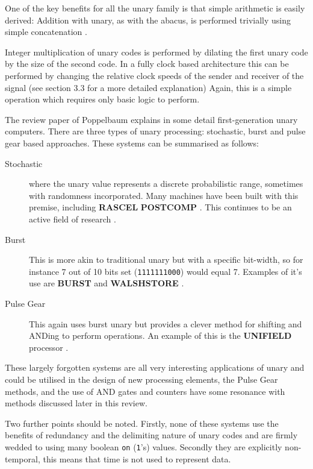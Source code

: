 \documentclass{article}
\begin{document}
One of the key benefits for all the unary family is that simple arithmetic is easily derived: Addition with unary, as with the abacus, is performed trivially using simple concatenation \cite{jonny1}. 

Integer multiplication of unary codes is performed by dilating the first unary code by the size of the second code. In a fully clock based architecture this can be performed by changing the relative clock speeds of the sender and receiver of the signal (see \cite{jonny1} section 3.3 for a more detailed explanation)  Again, this is a simple operation which requires only basic logic to perform. 

The review paper of Poppelbaum \cite{POPPELBAUM198747} explains in some detail first-generation unary computers. There are three types of unary processing: stochastic, burst and pulse gear based approaches. These systems can be summarised as follows:

\begin{description}
  \item[Stochastic] where the unary value represents a discrete probabilistic range, sometimes with randomness incorporated. Many machines have been built with this premise, including \textbf{RASCEL} \cite{esch1969rascel} \textbf{POSTCOMP} \cite{poppelbaum1967stochastic}. This continues to be an active field of research \cite{alaghi2013survey}.
  \item[Burst] This is more akin to traditional unary but with a specific bit-width, so for instance 7 out of 10 bits set (\texttt{1111111000}) would equal 7. Examples of it's use are \textbf{BURST} \cite{POPPELBAUM198747} and \textbf{WALSHSTORE} \cite{bracha1978walshstore}.
  \item[Pulse Gear] This again uses burst unary but provides a clever method for shifting and ANDing to perform operations. An example of this is the \textbf{UNIFIELD} processor \cite{dollas1987architecture}. 
\end{description}

These largely forgotten systems are all very interesting applications of unary and could be utilised in the design of new processing elements, the Pulse Gear methods, and the use of AND gates and counters have some resonance with methods discussed later in this review. 

Two further points should be noted. Firstly, none of these systems use the benefits of redundancy and the delimiting nature of unary codes and are firmly wedded to using many boolean \texttt{on} (\texttt{1}'s) values. Secondly they are explicitly non-temporal, this means that time is not used to represent data. 
\end{document}
